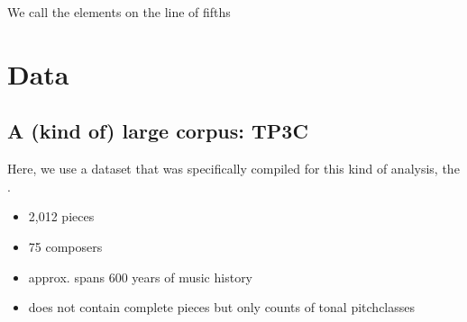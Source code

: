 \documentclass[letterpaper,10pt,english]{sphinxmanual}
\begin{document}
\begin{sphinxVerbatim}[commandchars=\\\{\}]
 
\end{sphinxVerbatim}

\begin{sphinxVerbatim}[commandchars=\\\{\}]
\end{sphinxVerbatim}

We call the elements on the line of fifths 


\section{Data}
\label{\detokenize{data-driven_music_history:data}}

\subsection{A (kind of) large corpus: TP3C}
\label{\detokenize{data-driven_music_history:a-kind-of-large-corpus-tp3c}}
Here, we use a dataset that was specifically compiled for this kind of
analysis, the  .
\begin{itemize}
\item {} 
2,012 pieces

\item {} 
75 composers

\item {} 
approx. spans 600 years of music history

\item {} 
does not contain complete pieces but only counts of tonal
pitch\sphinxhyphen{}classes

\end{itemize}

\begin{sphinxVerbatim}[commandchars=\\\{\}]
    

  
  

\end{sphinxVerbatim}
\end{document}
